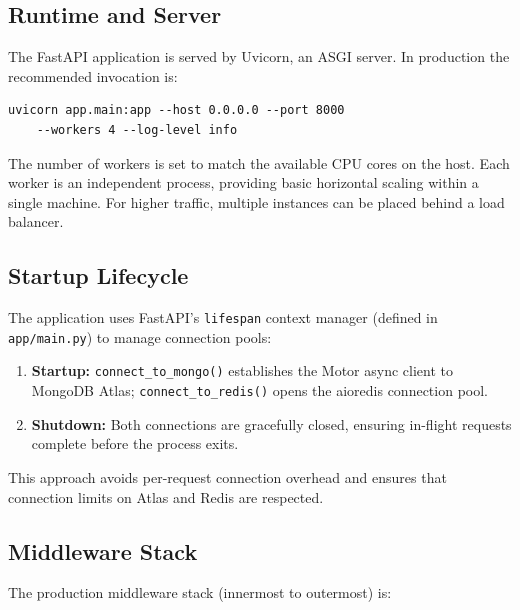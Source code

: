 \subsection{Runtime and Server}

The FastAPI application is served by Uvicorn, an ASGI server. In production the recommended invocation is:

\begin{verbatim}
uvicorn app.main:app --host 0.0.0.0 --port 8000
    --workers 4 --log-level info
\end{verbatim}

The number of workers is set to match the available CPU cores on the host. Each worker is an independent process, providing basic horizontal scaling within a single machine. For higher traffic, multiple instances can be placed behind a load balancer.

\subsection{Startup Lifecycle}

The application uses FastAPI's \texttt{lifespan} context manager (defined in \texttt{app/main.py}) to manage connection pools:

\begin{enumerate}
    \item \textbf{Startup:} \texttt{connect\_to\_mongo()} establishes the Motor async client to MongoDB Atlas; \texttt{connect\_to\_redis()} opens the aioredis connection pool.
    \item \textbf{Shutdown:} Both connections are gracefully closed, ensuring in-flight requests complete before the process exits.
\end{enumerate}

This approach avoids per-request connection overhead and ensures that connection limits on Atlas and Redis are respected.

\subsection{Middleware Stack}

The production middleware stack (innermost to outermost) is:

